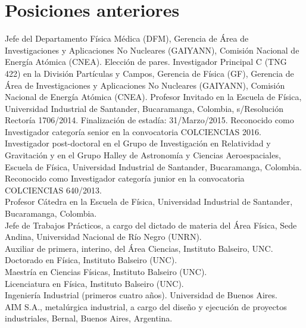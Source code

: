 \section*{Posiciones anteriores}
\noindent
{} Jefe del Departamento Física Médica (DFM), Gerencia de Área de Investigaciones y Aplicaciones No Nucleares (GAIYANN), Comisión Nacional de Energía Atómica (CNEA). Elección de pares.
 Investigador Principal C (TNG 422) en la División Partículas y Campos, Gerencia de Física (GF), Gerencia de Área de Investigaciones y Aplicaciones No Nucleares (GAIYANN), Comisión Nacional de Energía Atómica (CNEA).
 Profesor Invitado en la Escuela de Física, Universidad Industrial de Santander, Bucaramanga, Colombia, s/Resolución Rectoría 1706/2014. Finalización de estadía: 31/Marzo/2015. Reconocido como Investigador categoría senior en la convocatoria COLCIENCIAS 2016.\\
 Investigador post-doctoral en el Grupo de Investigación en Relatividad y Gravitación y en el Grupo Halley de Astronomía y Ciencias Aeroespaciales, Escuela de Física, Universidad Industrial de Santander, Bucaramanga, Colombia. Reconocido como Investigador categoría junior en la convocatoria COLCIENCIAS 640/2013.\\
 Profesor Cátedra en la Escuela de Física, Universidad Industrial de Santander, Bucaramanga, Colombia.\\
 Jefe de Trabajos Prácticos, a cargo del dictado de materia del Área Física, Sede Andina, Universidad Nacional de Río Negro (UNRN).\\
 Auxiliar de primera, interino, del Área Ciencias, Instituto Balseiro, UNC.\\
 Doctorado en Física, Instituto Balseiro (UNC).\\
 Maestría en Ciencias Físicas, Instituto Balseiro (UNC).\\
 Licenciatura en Física, Instituto Balseiro (UNC).\\
 Ingeniería Industrial (primeros cuatro años). Universidad de Buenos Aires.\\
 AIM S.A., metalúrgica industrial, a cargo del diseño y ejecución de proyectos industriales, Bernal, Buenos Aires, Argentina.\\
\fi
\fi

\ifeng
